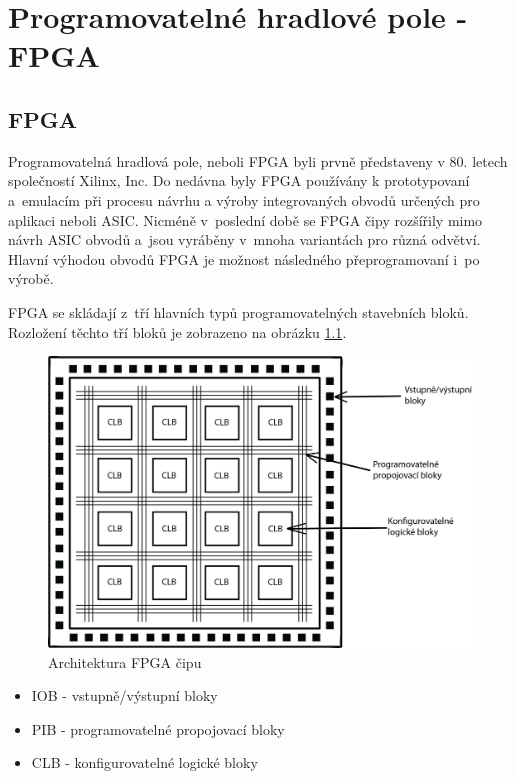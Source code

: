 %
%
%
\chapter{Programovatelné hradlové pole - FPGA}
\section{FPGA}
Programovatelná hradlová pole, neboli FPGA byli prvně představeny v 80. letech společností Xilinx, Inc. Do nedávna byly FPGA používány k prototypovaní a~emulacím při procesu návrhu a výroby integrovaných obvodů určených pro aplikaci neboli ASIC.\cite{Sekanina3540403779ISBN}
Nicméně v~poslední době se FPGA čipy rozšířily mimo návrh ASIC obvodů a~jsou vyráběny v~mnoha variantách pro různá odvětví. Hlavní výhodou obvodů FPGA je možnost následného přeprogramovaní i~po výrobě.\cite{FPGAfromMIT}

FPGA se skládají z~tří hlavních typů programovatelných stavebních bloků. Rozložení těchto tří bloků je zobrazeno na obrázku \ref{img:Architektura}.
\begin{figure}[!h]
  \begin{center}
    \includegraphics[scale=0.5]{obrazky/FPGA-architekrura-vlastni.png}
  \end{center}
  \caption[Architektura FPGA]{Architektura FPGA čipu \cite{electronicshub.org}}
  \label{img:Architektura}
\end{figure}
\begin{itemize}
    \item IOB - vstupně/výstupní bloky
    \item PIB - programovatelné propojovací bloky
    \item CLB - konfigurovatelné logické bloky
\end{itemize}


